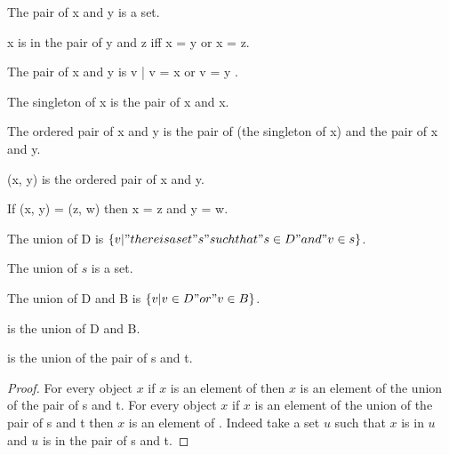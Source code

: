 \documentclass{article}
\begin{document}
\begin{forthel}
    \begin{signature}
      The pair of x and y is a set.
    \end{signature}

    \begin{axiom}[Pair]
      x is in the pair of y and z iff x = y or x = z.
    \end{axiom}

    \begin{lemma}
      The pair of x and y is { v | v = x or v = y }.
    \end{lemma}

    \begin{definition}
      The singleton of x is the pair of x and x.
    \end{definition}

    \begin{definition}
      The ordered pair of x and y is the pair of (the singleton of x) and the pair of x and y.
    \end{definition}

    \begin{definition}
      (x, y) is the ordered pair of x and y.
    \end{definition}

    \begin{lemma}[OrdPair]
      If (x, y) = (z, w) then x = z and y = w.
    \end{lemma}

    \begin{definition}
      The union of D is $\{ v | "there is a set" s "such that" s \in D "and" v \in s \}$.
    \end{definition}

    \begin{axiom}[Union]
      The union of $s$ is a set.
    \end{axiom}

    \begin{definition}
      The union of D and B is $\{ v | v \in D "or" v \in B \}$.
    \end{definition}

    \begin{definition}
       is the union of D and B.
    \end{definition}

    \begin{lemma}
       is the union of the pair of s and t.
    \end{lemma}
    \begin{proof}
      For every object $x$ if $x$ is an element of 
        then $x$ is an element of the union of the pair of s and t.
      For every object $x$ if $x$ is an element of the union of the pair of s and t
        then $x$ is an element of .
      Indeed take a set $u$ such that $x$ is in $u$ and $u$ is in the pair of s and t.
    \end{proof}


\end{forthel}
\end{document}
